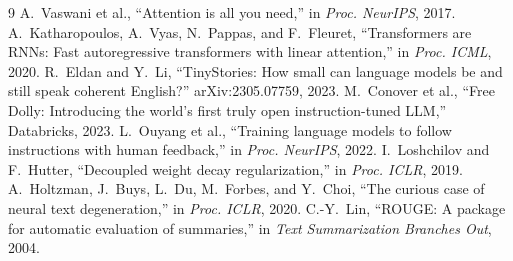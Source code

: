 \documentclass[conference]{IEEEtran}
\begin{document}
\begin{thebibliography}{9}
 A.~Vaswani et al., ``Attention is all you need,'' in \emph{Proc. NeurIPS}, 2017.
 A.~Katharopoulos, A.~Vyas, N.~Pappas, and F.~Fleuret, ``Transformers are RNNs: Fast
autoregressive transformers with linear attention,'' in \emph{Proc. ICML}, 2020.
 R.~Eldan and Y.~Li, ``TinyStories: How small can language models be and still speak coherent
English?'' arXiv:2305.07759, 2023.
 M.~Conover et al., ``Free Dolly: Introducing the world's first truly open instruction-tuned LLM,''
Databricks, 2023.
 L.~Ouyang et al., ``Training language models to follow instructions with human feedback,'' in
\emph{Proc. NeurIPS}, 2022.
 I.~Loshchilov and F.~Hutter, ``Decoupled weight decay regularization,'' in \emph{Proc. ICLR}, 2019.
 A.~Holtzman, J.~Buys, L.~Du, M.~Forbes, and Y.~Choi, ``The curious case of neural text
degeneration,'' in \emph{Proc. ICLR}, 2020.
 C.-Y.~Lin, ``ROUGE: A package for automatic evaluation of summaries,'' in \emph{Text Summarization
Branches Out}, 2004.
\end{thebibliography}
\end{document}
